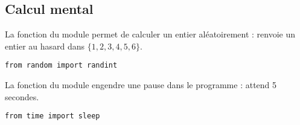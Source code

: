 \subsection{Calcul mental}
La fonction  du module  permet de calculer un entier aléatoirement :  renvoie un entier au hasard dans $\{1, 2, 3, 4, 5, 6\}$.
\begin{lstlisting}
from random import randint
\end{lstlisting}

La fonction  du module  engendre une pause dans le programme :  attend 5 secondes.

\begin{lstlisting}
from time import sleep
\end{lstlisting}


